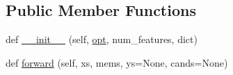 \subsection*{Public Member Functions}
\begin{DoxyCompactItemize}
\item 
def \hyperlink{classprojects_1_1personachat_1_1kvmemnn_1_1modules_1_1Kvmemnn_a29ff6f95968c32f32b08171d7c2094f0}{\+\_\+\+\_\+init\+\_\+\+\_\+} (self, \hyperlink{classprojects_1_1personachat_1_1kvmemnn_1_1modules_1_1Kvmemnn_ab471bbd25934cf2552ee9e4ff0d6f4cf}{opt}, num\+\_\+features, dict)
\item 
def \hyperlink{classprojects_1_1personachat_1_1kvmemnn_1_1modules_1_1Kvmemnn_aabb15e2db27624863502c19e647bdbda}{forward} (self, xs, mems, ys=None, cands=None)
\end{DoxyCompactItemize}
